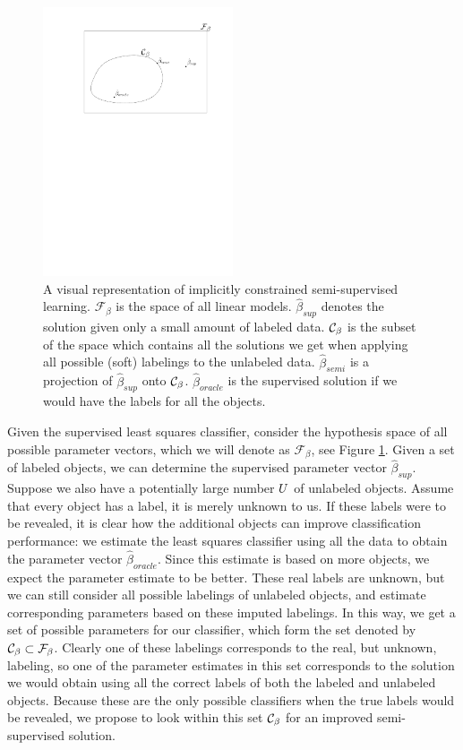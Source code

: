 \documentclass{elsarticle}
\begin{document}
\begin{figure}[ht] 
  \centering
      \includegraphics[width=0.5\textwidth]{../figures/constrainedspace.pdf}
  \caption{A visual representation of implicitly constrained semi-supervised learning. $\mathcal{F}_{\beta}$ is the space of all linear models. $\hat{\beta}_{sup}$ denotes the solution given only a small amount of labeled data. $\mathcal{C}_{\beta}$ is the subset of the space which contains all the solutions we get when applying all possible (soft) labelings to the unlabeled data. $\hat{\beta}_{semi}$ is a projection of $\hat{\beta}_{sup}$ onto $\mathcal{C}_{\beta}$. $\hat{\beta}_{oracle}$ is the supervised solution if we would have the labels for all the objects.} \label{fig:constrainedsubset}
\end{figure}

Given the supervised least squares classifier, consider the hypothesis space of all possible parameter vectors, which we will denote as $\mathcal{F}_{\beta}$, see Figure \ref{fig:constrainedsubset}. Given a set of labeled objects, we can determine the supervised parameter vector $\hat{\beta}_{sup}$. Suppose we also have a potentially large number $U$ of unlabeled objects. Assume that every object has a label, it is merely unknown to us. If these labels were to be revealed, it is clear how the additional objects can improve classification performance: we estimate the least squares classifier using all the data to obtain the parameter vector $\hat{\beta}_{oracle}$. Since this estimate is based on more objects, we expect the parameter estimate to be better. These real labels are unknown, but we can still consider all possible labelings of unlabeled objects, and estimate corresponding parameters based on these imputed labelings. In this way, we get a set of possible parameters for our classifier, which form the set denoted by $\mathcal{C}_{\beta} \subset \mathcal{F}_{\beta}$. Clearly one of these labelings corresponds to the real, but unknown, labeling, so one of the parameter estimates in this set corresponds to the solution we would obtain using all the correct labels of both the labeled and unlabeled objects. Because these are the only possible classifiers when the true labels would be revealed, we propose to look within this set $\mathcal{C}_{\beta}$ for an improved semi-supervised solution. 
\end{document}

